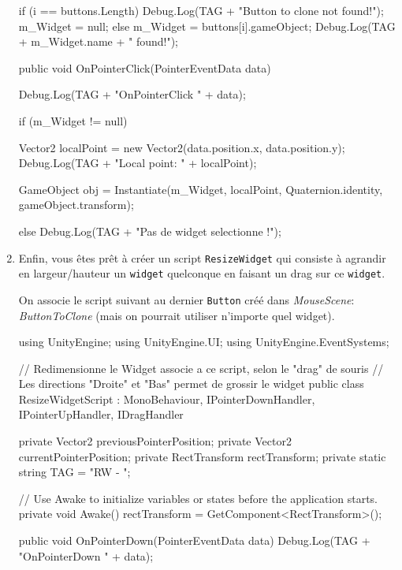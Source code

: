 \documentclass[a4paper,10pt]{article}
\newenvironment{solution}%
{\begin{tcolorbox}[breakable,colback=red!5!white,colframe=red!75!black,title=Solution]}%
{\end{tcolorbox}}
\newenvironment{boxcode}%
{\begin{tcolorbox}[breakable,colback=gray!5!white,colframe=black]}%
	{\end{tcolorbox}}
\begin{document}
\begin{enumerate}
\begin{solution}
\begin{boxcode}
\begin{csharpsansbord}
{{{			if (i == buttons.Length) {
				Debug.Log(TAG + "Button to clone not found!");
				m_Widget = null;
			}
			else {
				m_Widget = buttons[i].gameObject;
				Debug.Log(TAG + m_Widget.name + " found!");				
			}
		}
	}
	
	public void OnPointerClick(PointerEventData data)
	{
		Debug.Log(TAG + "OnPointerClick " + data);		
		
		if (m_Widget != null) {
			Vector2 localPoint = new Vector2(data.position.x, data.position.y);
			Debug.Log(TAG + "Local point: " + localPoint);
			
			GameObject obj = Instantiate(m_Widget,
			localPoint,
			Quaternion.identity,
			gameObject.transform);
		}
		else {
			Debug.Log(TAG + "Pas de widget selectionne !");
		}
	}
}

\end{csharpsansbord}
\end{boxcode}

\end{solution}	
\fi 
		
	
	\item Enfin, vous êtes prêt à créer un script \texttt{ResizeWidget} qui consiste à agrandir en largeur/hauteur un \texttt{widget} quelconque en faisant un drag sur ce \texttt{widget}.
	
\ifversionenseignant
\begin{solution}
On associe le script suivant au dernier \texttt{Button} créé dans \textit{MouseScene}: \textit{ButtonToClone} (mais on pourrait utiliser n'importe quel widget).
	
\begin{boxcode}
\begin{csharpsansbord}
using UnityEngine;
using UnityEngine.UI;
using UnityEngine.EventSystems;

// Redimensionne le Widget associe a ce script, selon le "drag" de souris
// Les directions "Droite" et "Bas" permet de grossir le widget
public class ResizeWidgetScript : MonoBehaviour, IPointerDownHandler,
   IPointerUpHandler, IDragHandler
{
	private Vector2 previousPointerPosition;
	private Vector2 currentPointerPosition;
	private RectTransform rectTransform;
	private static string TAG = "RW - ";
	
	// Use Awake to initialize variables or states before the application starts.	
	private void Awake() { rectTransform = GetComponent<RectTransform>(); }
	
	public void OnPointerDown(PointerEventData data) {
		Debug.Log(TAG + "OnPointerDown " + data);
	}
	
}
\end{csharpsansbord}
\end{boxcode}
\end{solution}
\end{enumerate}
\end{document}
